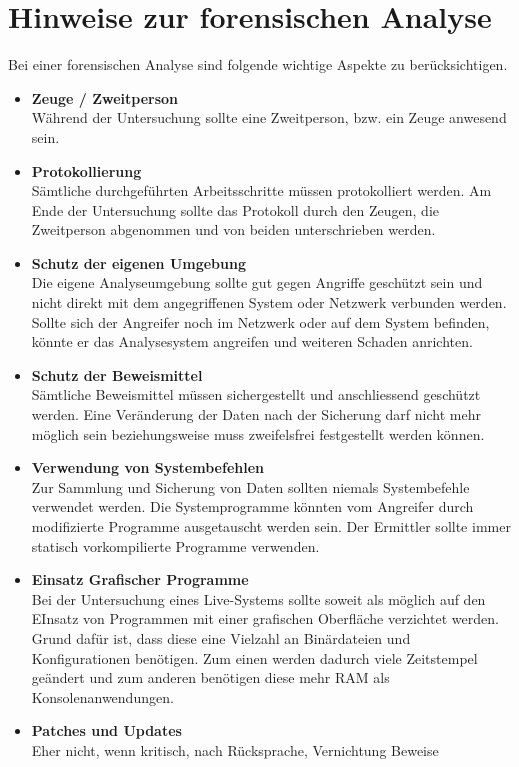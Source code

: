 \section{Hinweise zur forensischen Analyse}
Bei einer forensischen Analyse sind folgende wichtige Aspekte zu berücksichtigen.

\begin{itemize}
\item \textbf{Zeuge / Zweitperson} \\
Während der Untersuchung sollte eine Zweitperson, bzw. ein Zeuge anwesend sein.
\item \textbf{Protokollierung} \\
Sämtliche durchgeführten Arbeitsschritte müssen protokolliert werden. Am Ende der Untersuchung sollte das Protokoll durch den Zeugen, die Zweitperson abgenommen und von beiden unterschrieben werden.
\item \textbf{Schutz der eigenen Umgebung} \\
Die eigene Analyseumgebung sollte gut gegen Angriffe geschützt sein und nicht direkt mit dem angegriffenen System oder Netzwerk verbunden werden. Sollte sich der Angreifer noch im Netzwerk oder auf dem System befinden, könnte er das Analysesystem angreifen und weiteren Schaden anrichten.
\item \textbf{Schutz der Beweismittel} \\
Sämtliche Beweismittel müssen sichergestellt und anschliessend geschützt werden. Eine Veränderung der Daten nach der Sicherung darf nicht mehr möglich sein beziehungsweise muss zweifelsfrei festgestellt werden können.
\item \textbf{Verwendung von Systembefehlen} \\
Zur Sammlung und Sicherung von Daten sollten niemals Systembefehle verwendet werden. Die Systemprogramme könnten vom Angreifer durch modifizierte Programme ausgetauscht werden sein. Der Ermittler sollte immer statisch vorkompilierte Programme verwenden.
\item \textbf{Einsatz Grafischer Programme} \\
Bei der Untersuchung eines Live-Systems sollte soweit als möglich auf den EInsatz von Programmen mit einer grafischen Oberfläche verzichtet werden. Grund dafür ist, dass diese eine Vielzahl an Binärdateien und Konfigurationen benötigen. Zum einen werden dadurch viele Zeitstempel geändert und zum anderen benötigen diese mehr RAM als Konsolenanwendungen.
\item \textbf{Patches und Updates} \\
Eher nicht, wenn kritisch, nach Rücksprache, Vernichtung Beweise
\end{itemize}
